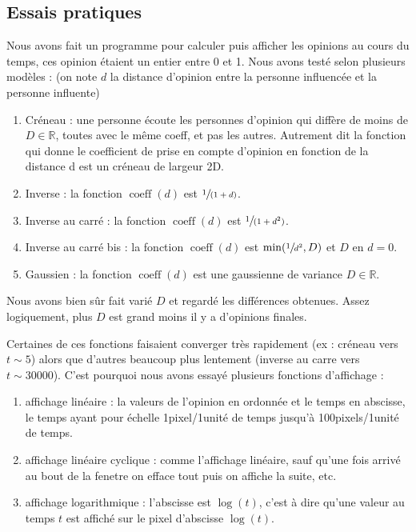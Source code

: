 \documentclass[a4paper,10pt]{article}
\begin{document}
\subsection{Essais pratiques}

Nous avons fait un programme pour calculer puis afficher les opinions au cours du temps, ces opinion étaient un entier entre 0 et 1. Nous avons testé selon plusieurs modèles : (on note $d$ la distance d'opinion entre la personne influencée et la personne influente)
\begin{enumerate}
\item Créneau : une personne écoute les personnes d'opinion qui diffère de moins de $D \in \mathbb{R}$, toutes avec le même coeff, et pas les autres. Autrement dit la fonction qui donne le coefficient de prise en compte d'opinion en fonction de la distance d est un créneau de largeur 2D.

\item Inverse : la fonction $\operatorname{coeff}(d)$ est $\sfrac{1}{(1+d)}$.

\item Inverse au carré : la fonction $\operatorname{coeff}(d)$ est $\sfrac{1}{(1+d^2)}$.

\item Inverse au carré bis : la fonction $\operatorname{coeff}(d)$ est $\min(\sfrac{1}{d^2}, D)$ et $D$ en $d=0$.

\item Gaussien : la fonction $\operatorname{coeff}(d)$ est une gaussienne de variance $D \in \mathbb{R}$.
\end{enumerate}

Nous avons bien sûr fait varié $D$ et regardé les différences obtenues. Assez logiquement, plus $D$ est grand moins il y a d'opinions finales.

Certaines de ces fonctions faisaient converger très rapidement (ex : créneau vers $t \sim 5$) alors que d'autres beaucoup plus lentement (inverse au carre vers $t \sim 30000$). C'est pourquoi nous avons essayé plusieurs fonctions d'affichage :
\begin{enumerate}
\item affichage linéaire : la valeurs de l'opinion en ordonnée et le temps en abscisse, le temps ayant pour échelle 1pixel/1unité de temps jusqu'à 100pixels/1unité de temps.

\item affichage linéaire cyclique : comme l'affichage linéaire, sauf qu'une fois arrivé au bout de la fenetre on efface tout puis on affiche la suite, etc.

\item affichage logarithmique : l'abscisse est $\log(t)$, c'est à dire qu'une valeur au temps $t$ est affiché sur le pixel d'abscisse $\log(t)$.
\end{enumerate}
\end{document}
